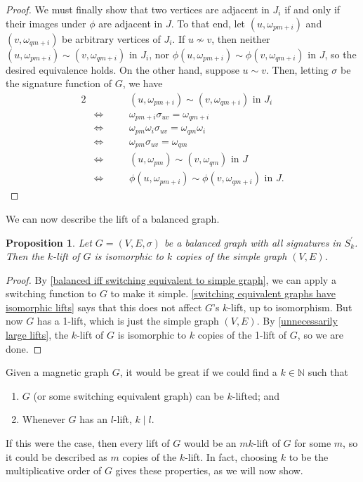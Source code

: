 \documentclass[12pt]{article}
\newtheorem{prop}[thm]{Proposition}
\theoremstyle{definition}
\newcommand{\N}{\mathbb N}
\begin{document}
\begin{proof}
We must finally show that two vertices are adjacent in $J_i$ if and only if their images under $\phi$ are adjacent in $J$. To that end, let $(u, \omega_{pm + i})$ and $(v, \omega_{qm + i})$ be arbitrary vertices of $J_i$. If $u \not\sim v$, then neither $(u, \omega_{pm + i}) \sim (v, \omega_{qm + i})$ in $J_i$, nor $\phi (u, \omega_{pm + i}) \sim \phi (v, \omega_{qm + i})$ in $J$, so the desired equivalence holds. On the other hand, suppose $u \sim v$. Then, letting $\sigma$ be the signature function of $G$, we have
\begin{alignat*}{2}
& & &(u, \omega_{pm + i}) \sim (v, \omega_{qm + i}) \text{ in } J_i \\
&\iff\quad & &\omega_{pm + i} \sigma_{uv} = \omega_{qm + i} \\
&\iff & &\omega_{pm} \omega_i \sigma_{uv} = \omega_{qm} \omega_i \\
&\iff & &\omega_{pm} \sigma_{uv} = \omega_{qm} \\
&\iff & &(u, \omega_{pm}) \sim (v, \omega_{qm}) \text{ in } J \\
&\iff & &\phi (u, \omega_{pm + i}) \sim \phi (v, \omega_{qm + i}) \text{ in } J.
\end{alignat*}
\end{proof}

We can now describe the lift of a balanced graph.

\begin{prop}
Let $G=(V, E, \sigma)$ be a balanced graph with all signatures in $S^\prime_k$. Then the $k$-lift of $G$ is isomorphic to $k$ copies of the simple graph $(V, E)$.
\end{prop}
\begin{proof}
By \cref{balanced iff switching equivalent to simple graph}, we can apply a switching function to $G$ to make it simple. \cref{switching equivalent graphs have isomorphic lifts} says that this does not affect $G$'s $k$-lift, up to isomorphism. But now $G$ has a 1-lift, which is just the simple graph $(V, E)$. By \cref{unnecessarily large lifts}, the $k$-lift of $G$ is isomorphic to $k$ copies of the 1-lift of $G$, so we are done.
\end{proof}

Given a magnetic graph $G$, it would be great if we could find a $k \in \N$ such that 
\begin{enumerate}
\item $G$ (or some switching equivalent graph) can be $k$-lifted; and
\item Whenever $G$ has an $l$-lift, $k \mid l$.
\end{enumerate}
If this were the case, then every lift of $G$ would be an $mk$-lift of $G$ for some $m$, so it could be described as $m$ copies of the $k$-lift. In fact, choosing $k$ to be the multiplicative order of $G$ gives these properties, as we will now show.
\end{document}
